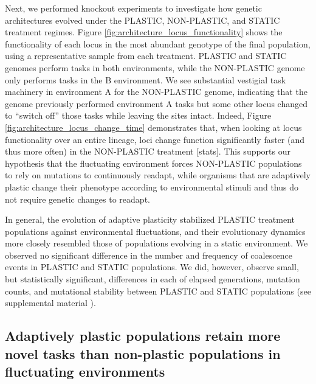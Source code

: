 Next, we performed knockout experiments to investigate how genetic architectures evolved under the PLASTIC, NON-PLASTIC, and STATIC treatment regimes.
Figure \ref{fig:architecture_locus_functionality} shows the functionality of each locus in the most abundant genotype of the final population, using a representative sample from each treatment. 
PLASTIC and STATIC genomes perform tasks in both environments, while the NON-PLASTIC genome only performs tasks in the B environment.
We see substantial vestigial task machinery in environment A for the NON-PLASTIC genome, indicating that the genome previously performed environment A tasks but some other locus changed to ``switch off'' those tasks while leaving the sites intact.  
Indeed, Figure \ref{fig:architecture_locus_change_time} demonstrates that, when looking at locus functionality over an entire lineage, loci change function significantly faster (and thus more often) in the NON-PLASTIC treatment [stats].
This supports our hypothesis that the fluctuating environment forces NON-PLASTIC populations to rely on mutations to continuously readapt, while organisms that are adaptively plastic change their phenotype according to environmental stimuli and thus do not require genetic changes to readapt. 


In general, the evolution of adaptive plasticity stabilized PLASTIC treatment populations against environmental fluctuations, and their evolutionary dynamics more closely resembled those of populations evolving in a static environment.
We observed no significant difference in the number and frequency of coalescence events in PLASTIC and STATIC populations.
We did, however, observe small, but statistically significant, differences in each of elapsed generations, mutation counts, and mutational stability between PLASTIC and STATIC populations (see supplemental material \citealt{supplemental_material}).

\vspace{0.5cm}
\subsection{Adaptively plastic populations retain more novel tasks than non-plastic populations in fluctuating environments}

